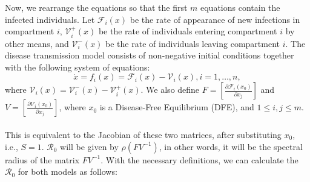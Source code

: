 Now, we rearrange the equations so that the first $m$ equations 
contain the infected individuals. Let ${\mathcal F}_i(x)$ be the 
rate of appearance of new infections in compartment $i$, 
${\mathcal V}_i^+(x)$ be the rate of individuals entering 
compartment $i$ by other means, and ${\mathcal V}_i^-(x)$ 
be the rate of individuals leaving compartment $i$. The disease 
transmission model consists of non-negative initial conditions 
together with the following system of equations:
$$\dot{x}=f_i(x)={\mathcal F}_i(x)-{\mathcal V}_i(x), i=1,\ldots, n,$$
where ${\mathcal V}_i (x) = {\mathcal V}_i^{-}(x) - {\mathcal V}_i^+(x)$. 
We also define 
$F=\left[\frac{\partial {\mathcal F}_i (x_0)}{\partial x_j}\right]$ 
and $V=\left[\frac{\partial {\mathcal V}_i (x_0) }{\partial x_j}\right]$, 
where $x_0$ is a Disease-Free Equilibrium (DFE), and $1\leq i,j \leq m$.
\\\\
This is equivalent to the Jacobian of these two matrices, 
after substituting $x_0$, i.e., $S=1$. $\mathcal{R}_0$ will be given 
by $\rho(FV^{-1})$, in other words, it will be the spectral radius 
of the matrix $FV^{-1}$. With the necessary definitions, we can 
calculate the $\mathcal{R}_0$ for both models as follows:
